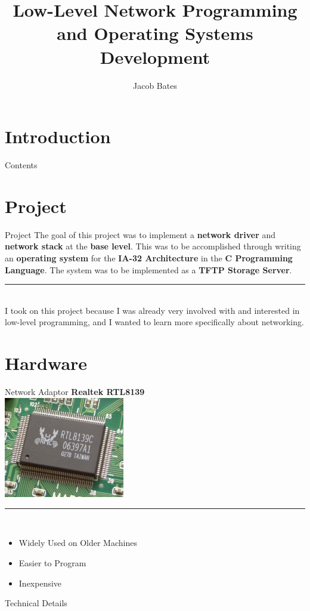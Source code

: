 \documentclass{beamer}
\title{Low-Level Network Programming and Operating Systems Development}
\author{Jacob Bates}
\institute{Da Vinci Science High School}
\begin{document}
\section{Introduction}

    \begin{frame}
        \titlepage
    \end{frame}

    \begin{frame}{Contents}
        \tableofcontents
    \end{frame}

\section{Project}

    \begin{frame}{Project}
        The goal of this project was to implement a \textbf{network driver} and \textbf{network stack} at the \textbf{base level}.
        This was to be accomplished through writing an \textbf{operating system} for the \textbf{IA-32 Architecture} in the \textbf{C Programming Language}.
        The system was to be implemented as a \textbf{TFTP Storage Server}.\\
        \rule{0.5\textwidth}{0.5pt}\\
        I took on this project because I was already very involved with and interested in low-level programming, and I wanted to learn more specifically about networking.
    \end{frame}

\section{Hardware}

    \begin{frame}{Network Adaptor}
        \textbf{Realtek RTL8139}\\
        \includegraphics[height=125pt]{Realtek_RTL8139C.jpg}\\
        \rule{0.5\textwidth}{0.5pt}\\
        \begin{itemize}
            \item Widely Used on Older Machines
            \item Easier to Program
            \item Inexpensive
        \end{itemize}
    \end{frame}

    \begin{frame}{Technical Details}

    \end{frame}
\end{document}
